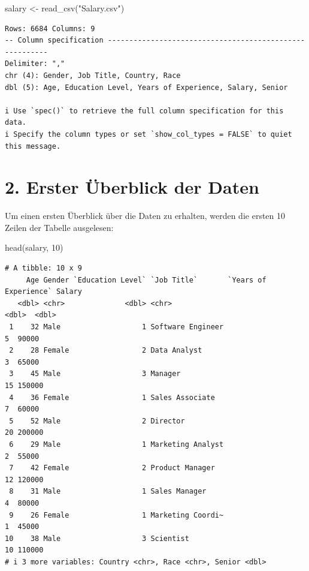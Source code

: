 \documentclass[
  letterpaper,
  DIV=11,
  numbers=noendperiod]{scrartcl}
\newenvironment{Shaded}{\begin{snugshade}}{\end{snugshade}}
\newcommand{\DecValTok}[1]{\textcolor[rgb]{0.68,0.00,0.00}{#1}}
\newcommand{\FunctionTok}[1]{\textcolor[rgb]{0.28,0.35,0.67}{#1}}
\newcommand{\NormalTok}[1]{\textcolor[rgb]{0.00,0.23,0.31}{#1}}
\newcommand{\OtherTok}[1]{\textcolor[rgb]{0.00,0.23,0.31}{#1}}
\newcommand{\StringTok}[1]{\textcolor[rgb]{0.13,0.47,0.30}{#1}}
\begin{document}
\begin{Shaded}
\begin{Highlighting}[]
\NormalTok{salary }\OtherTok{\textless{}{-}} \FunctionTok{read\_csv}\NormalTok{(}\StringTok{"Salary.csv"}\NormalTok{)}
\end{Highlighting}
\end{Shaded}

\begin{verbatim}
Rows: 6684 Columns: 9
-- Column specification --------------------------------------------------------
Delimiter: ","
chr (4): Gender, Job Title, Country, Race
dbl (5): Age, Education Level, Years of Experience, Salary, Senior

i Use `spec()` to retrieve the full column specification for this data.
i Specify the column types or set `show_col_types = FALSE` to quiet this message.
\end{verbatim}

\hypertarget{erster-uxfcberblick-der-daten}{%
\section{2. Erster Überblick der
Daten}\label{erster-uxfcberblick-der-daten}}

Um einen ersten Überblick über die Daten zu erhalten, werden die ersten
10 Zeilen der Tabelle ausgelesen:

\begin{Shaded}
\begin{Highlighting}[]
\FunctionTok{head}\NormalTok{(salary, }\DecValTok{10}\NormalTok{)}
\end{Highlighting}
\end{Shaded}

\begin{verbatim}
# A tibble: 10 x 9
     Age Gender `Education Level` `Job Title`       `Years of Experience` Salary
   <dbl> <chr>              <dbl> <chr>                             <dbl>  <dbl>
 1    32 Male                   1 Software Engineer                     5  90000
 2    28 Female                 2 Data Analyst                          3  65000
 3    45 Male                   3 Manager                              15 150000
 4    36 Female                 1 Sales Associate                       7  60000
 5    52 Male                   2 Director                             20 200000
 6    29 Male                   1 Marketing Analyst                     2  55000
 7    42 Female                 2 Product Manager                      12 120000
 8    31 Male                   1 Sales Manager                         4  80000
 9    26 Female                 1 Marketing Coordi~                     1  45000
10    38 Male                   3 Scientist                            10 110000
# i 3 more variables: Country <chr>, Race <chr>, Senior <dbl>
\end{verbatim}
\end{document}
